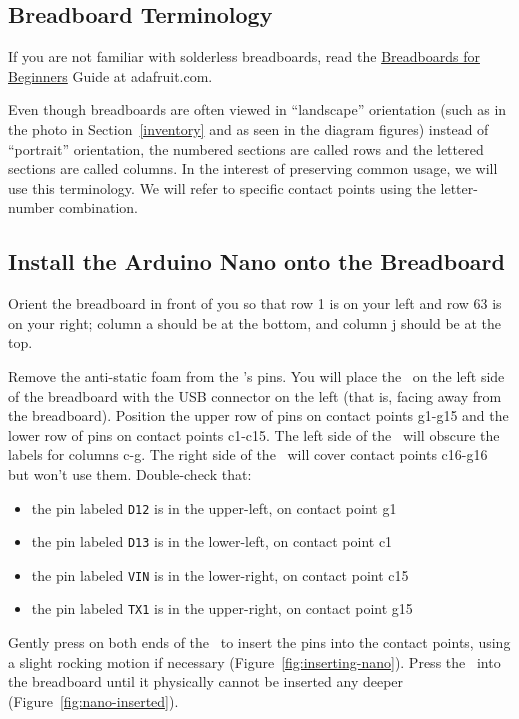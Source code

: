\subsection{Breadboard Terminology}

If you are not familiar with solderless breadboards, read the
\href{https://learn.adafruit.com/breadboards-for-beginners?view=all}{Breadboards for Beginners}
Guide at adafruit.com.

Even though breadboards are often viewed in ``landscape'' orientation (such
as in the photo in Section~\ref{inventory} and as seen in the diagram figures)
instead of ``portrait'' orientation, the numbered sections are called rows and
the lettered sections are called columns. In the interest of preserving common
usage, we will use this terminology. We will refer to specific contact points
using the letter-number combination.

\subsection{Install the Arduino Nano onto the Breadboard}

Orient the breadboard in front of you so that row 1 is on your left and row 63
is on your right; column a should be at the bottom, and column j should be at
the top.

Remove the anti-static foam from the \nano's pins. You will place the
\nano\ on the left side of the breadboard with the USB connector on the
left (that is, facing away from the breadboard). Position the upper row of pins
on contact points g1-g15 and the lower row of pins on contact points c1-c15.
The left side of the \nano\ will obscure the labels for columns c-g. The
right side of the \nano\ will cover contact points c16-g16 but won't use
them. Double-check that:
 \begin{itemize}
    \item the pin labeled \texttt{D12} is in the upper-left, on contact point g1
    \item the pin labeled \texttt{D13} is in the lower-left, on contact point c1
    \item the pin labeled \texttt{VIN} is in the lower-right, on contact point
        c15
    \item the pin labeled \texttt{TX1} is in the upper-right, on contact point
        g15
\end{itemize}

Gently press on both ends of the \nano\ to insert the pins into the
contact points, using a slight rocking motion if necessary
(Figure~\ref{fig:inserting-nano}). Press the \nano\ into the breadboard until it
physically cannot be inserted any deeper (Figure~\ref{fig:nano-inserted}).

